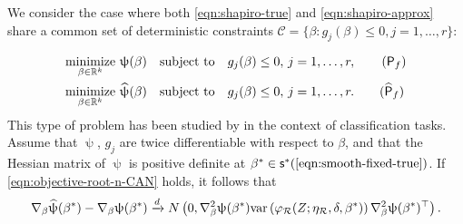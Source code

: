 We consider the case where both \ref{eqn:shapiro-true} and \ref{eqn:shapiro-approx} share a common set of deterministic
constraints $\mathcal{C} = \{\beta : g_j(\beta) \leq 0, j=1,\ldots,r\}$:

\begin{align} 
    & \underset{\beta \in \R^k}{\text{minimize}} \,\,  \uppsi(\beta)  
    \quad \text{subject to} \quad g_j(\beta) \leq 0, \, j=1,\ldots,r, \tag{$\mathsf{P}_{f}$} \label{eqn:smooth-fixed-true} \\
    &\underset{\beta \in \R^k}{\text{minimize}} \,\,  \widehat{\uppsi}(\beta)  
    \quad \text{subject to} \quad g_j(\beta) \leq 0, \, j=1,\ldots,r. \tag{$\widehat{\mathsf{P}}_{f}$} \label{eqn:smooth-fixed-approx}
\end{align} 
This type of problem has been studied by \citet{kim2022counterfactual} in the context of classification tasks. Assume that $\uppsi$, $g_j$ are twice differentiable with respect to $\beta$, and that the Hessian matrix of $\uppsi$ is positive definite at $\beta^* \in \mathsf{s}^*(\text{\ref{eqn:smooth-fixed-true}})$. If \eqref{eqn:objective-root-n-CAN} holds, it follows that
\begin{align} \label{eqn:objective-derivatie-root-CAN}
    \nabla_{\beta} \widehat{\uppsi}(\beta^*) - \nabla_{\beta} \uppsi(\beta^*) \xrightarrow{d} N\left( 0, \nabla^2_{\beta} \uppsi(\beta^*) \text{var}\left(\varphi_{\mathcal{R}}(Z;\eta_{\mathcal{R}},\delta,\beta^*)\right) \nabla^2_{\beta} \uppsi(\beta^*)^\top \right).
\end{align}

